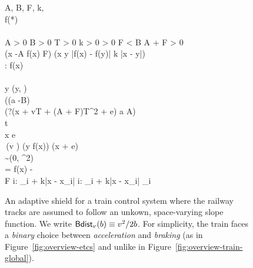 \begin{figure}
  \begin{center}
  \begin{sllisting}
    \slconstant A, B, F, k, \sigma \\
    \slunknown f(*) \\
    \slassume \\
      \slind A > 0 \commasep B > 0 \commasep T > 0 \commasep k > 0 \commasep \sigma > 0 \commasep F < B \commasep A + F > 0 \commasep \\
      \slind (\lforall x -A \le f(x) \le F) \commasep (\lforall x \lforall y |f(x) - f(y)| \le k |x - y|) \\
    \slbound %
      \TrainFxMax: f(x) \le \TrainFxMax
    \\
    \slcontroller \\
      \slind y \dlassign \min(y, \TrainFxMax) \seq \\
      \slind ((a \dlassign -B) \ \cup \\
      \slind \phantom{(}(?(x + vT + (A + F)T^2 +  \le e) \seq a \dlassign A) \\
    \slplant t  \seq {} \\
    \slsafe x \le e \\
    \slinvariant \,(v ) \land
      (y \ge f(x)) \land (x +  \le e)
       \\
    \slnoise \eta \sim \slnormal(0, \sigma^2) \\
    \slobserve \omega = f(x) - \eta \\
    \slinfer
      \TrainFxMax \slassign F \seq
      \TrainFxMax \slassign \slbest i: \TrainFxMax_i + k|x - x_i| \seq
      \TrainFxMax \slassign \slaggregate i: \omega_i + k|x - x_i| \sland \eta_i \\
  \end{sllisting}
  \end{center}
  \caption{An adaptive shield for a train control system where the railway tracks are assumed to follow an unkown, space-varying slope function. We write $\textsf{Bdist}_{v}(b) \equiv v^2/2b$. For simplicity, the train faces a \emph{binary} choice between \emph{acceleration} and \emph{braking} (as in Figure~\ref{fig:overview-etcs} and unlike in Figure~\ref{fig:overview-train-global}).}\label{fig:overview-train-local}
  \Description[]{}
\end{figure}
